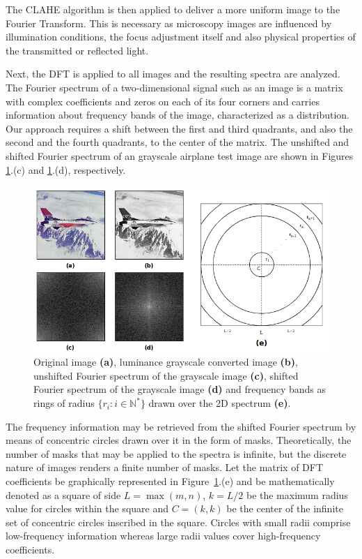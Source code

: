 The CLAHE algorithm is then applied  to deliver a more uniform image to the Fourier Transform. This is necessary as microscopy images are influenced by illumination conditions, the focus adjustment itself and also physical properties of the transmitted or reflected light.

Next, the DFT is applied to all images and the resulting spectra are analyzed. The Fourier spectrum of a two-dimensional signal such as an image is a matrix with complex coefficients and zeros on each of its four corners and carries information about frequency bands of the image, characterized as a distribution. Our approach requires a shift between the first and third quadrants, and also the second and the fourth quadrants, to the center of the matrix. The unshifted and shifted Fourier spectrum of an grayscale airplane test image are shown in Figures \ref{fig:fourier_spectrum}.(c) and \ref{fig:fourier_spectrum}.(d), respectively. 

\begin{figure}[ht]
	\centering
	\caption{Original image \textbf{(a)}, luminance grayscale converted image \textbf{(b)}, unshifted Fourier spectrum of the grayscale image \textbf{(c)}, shifted Fourier spectrum of the grayscale image \textbf{(d)} and frequency bands as rings of radius $\{r_{i}: i\in\mathbb{N}^{*}\}$ drawn over the 2D spectrum \textbf{(e)}.}
	\label{fig:fourier_spectrum}
	\includegraphics[scale=0.6]{images/fourier_spectrum.png}
	\centering
	\fautor
\end{figure}

The frequency information may be retrieved from the shifted Fourier spectrum by means of concentric circles drawn over it in the form of masks. Theoretically, the number of masks that may be applied to the spectra is infinite, but the discrete nature of images renders a finite number of masks. Let the matrix of DFT coefficients be graphically represented in Figure~\ref{fig:fourier_spectrum}.(e) and be mathematically denoted as a square of side $L = \max{(m,n)}$, $k = L / 2$ be the maximum radius value for circles within the square and $C = (k,k)$ be the center of the infinite set of concentric circles inscribed in the square. Circles with small radii comprise low-frequency information whereas large radii values cover high-frequency coefficients.

